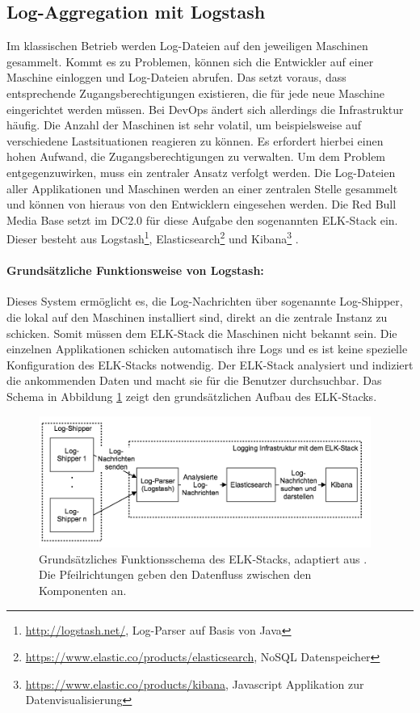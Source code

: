 \subsection{Log-Aggregation mit Logstash}
\label{sec:logstash:main}
Im klassischen Betrieb werden Log-Dateien auf den jeweiligen Maschinen gesammelt. Kommt es zu Problemen, können sich die Entwickler auf einer Maschine einloggen und Log-Dateien abrufen. Das setzt voraus, dass entsprechende Zugangsberechtigungen existieren, die für jede neue Maschine eingerichtet werden müssen. Bei DevOps ändert sich allerdings die Infrastruktur häufig. Die Anzahl der Maschinen ist sehr volatil, um beispielsweise auf verschiedene Lastsituationen reagieren zu können. Es erfordert hierbei einen hohen Aufwand, die Zugangsberechtigungen zu verwalten. Um dem Problem entgegenzuwirken, muss ein zentraler Ansatz verfolgt werden. Die Log-Dateien aller Applikationen und Maschinen werden an einer zentralen Stelle gesammelt und können von hieraus von den Entwicklern eingesehen werden. Die Red Bull Media Base setzt im DC2.0 für diese Aufgabe den sogenannten ELK-Stack ein. Dieser besteht aus Logstash\footnote{\url{http://logstash.net/}, Log-Parser auf Basis von Java}, Elasticsearch\footnote{\url{https://www.elastic.co/products/elasticsearch}, NoSQL Datenspeicher} und Kibana\footnote{\url{https://www.elastic.co/products/kibana}, Javascript Applikation zur Datenvisualisierung} \cite{Papaspyrou2014}.

\paragraph{Grundsätzliche Funktionsweise von Logstash:}
Dieses System ermöglicht es, die Log-Nachrichten über sogenannte Log-Shipper, die lokal auf den Maschinen installiert sind, direkt an die zentrale Instanz zu schicken. Somit müssen dem ELK-Stack die Maschinen nicht bekannt sein. Die einzelnen Applikationen schicken automatisch ihre Logs und es ist keine spezielle Konfiguration des ELK-Stacks notwendig. Der ELK-Stack analysiert und indiziert die ankommenden Daten und macht sie für die Benutzer durchsuchbar. Das Schema in Abbildung \ref{fig:logstash:schema} zeigt den grundsätzlichen Aufbau des ELK-Stacks.

\begin{figure}[ht]
	\centering
	\includegraphics[width=0.97\textwidth]{img/logstash.png}
	\caption[Grundsätzliches Funktionsschema des ELK-Stacks, adaptiert aus \cite{Papaspyrou2014}]{Grundsätzliches Funktionsschema des ELK-Stacks, adaptiert aus \cite{Papaspyrou2014}. Die Pfeilrichtungen geben den Datenfluss zwischen den Komponenten an.}
	\label{fig:logstash:schema}
\end{figure} 

